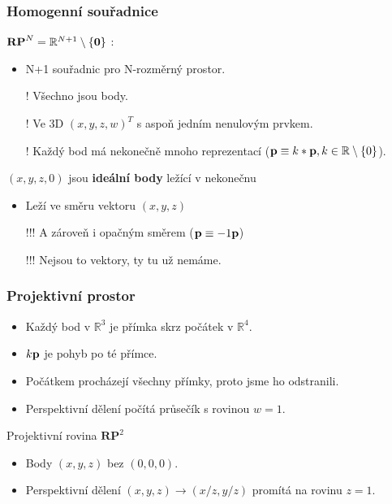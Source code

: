 \begin{frame}
    \frametitle{Homogenní souřadnice}
    $\mathbf{RP}^N = \mathbb{R}^{N+1} \setminus \{\mathbf{0}\}$ :
    \begin{itemize}
        \item N+1 souřadnic pro N-rozměrný prostor.
        \item[\color{red}!] Všechno jsou body.
        \item[\color{red}!] Ve 3D $(x, y, z, w)^T$ s aspoň jedním nenulovým prvkem.
        \item[\color{red}!] Každý bod má nekonečně mnoho reprezentací ($\mathbf{p} \equiv k*\mathbf{p}, k \in \mathbb{R} \setminus \{0\}$).
    \end{itemize}
    \pause\vfill
    $(x,y,z,0)$ jsou \textbf{ideální body} ležící v nekonečnu
    \begin{itemize}
        \item Leží ve směru vektoru $(x,y,z)$
        \item[\color{red}!!!] A zároveň i opačným směrem ($\mathbf{p} \equiv -1\mathbf{p}$)
        \item[\color{red}!!!] Nejsou to vektory, ty tu už nemáme.
    \end{itemize}
\end{frame}

\begin{frame}
    \frametitle{Projektivní prostor}
    \begin{itemize}
        \item Každý bod v $\mathbb{R}^3$ je přímka skrz počátek v $\mathbb{R}^4$.
        \item $k\mathbf{p}$ je pohyb po té přímce.
        \item Počátkem procházejí všechny přímky, proto jsme ho odstranili.
        \item Perspektivní dělení počítá průsečík s rovinou $w = 1$.
    \end{itemize}
    \pause\vfill
    Projektivní rovina $\mathbf{RP}^2$
    \begin{itemize}
        \item Body $(x,y,z)$ bez $(0,0,0)$.
        \item Perspektivní dělení $(x,y,z) \rightarrow (x/z,y/z)$ promítá na rovinu $z=1$.
    \end{itemize}
\end{frame}
